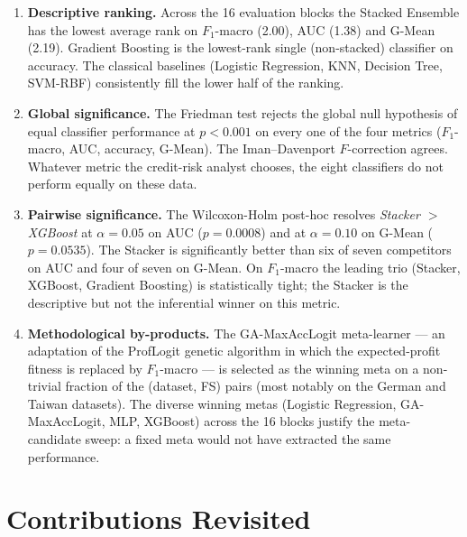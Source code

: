 \begin{enumerate}
 \item \textbf{Descriptive ranking.} Across the 16 evaluation
 blocks the Stacked Ensemble has the lowest average rank on
 $F_1$-macro (2.00), AUC (1.38) and G-Mean (2.19). Gradient
 Boosting is the lowest-rank single (non-stacked) classifier
 on accuracy. The classical baselines (Logistic Regression,
 KNN, Decision Tree, SVM-RBF) consistently fill the lower half
 of the ranking.
 \item \textbf{Global significance.} The Friedman test rejects
 the global null hypothesis of equal classifier performance at
 $p<0.001$ on every one of the four metrics ($F_1$-macro, AUC,
 accuracy, G-Mean). The Iman--Davenport $F$-correction agrees.
 Whatever metric the credit-risk analyst chooses, the eight
 classifiers do not perform equally on these data.
 \item \textbf{Pairwise significance.} The Wilcoxon-Holm
 post-hoc resolves \emph{Stacker $>$ XGBoost} at $\alpha=0.05$
 on AUC ($p=0.0008$) and at $\alpha=0.10$ on G-Mean
 ($p=0.0535$). The Stacker is significantly better than six
 of seven competitors on AUC and four of seven on G-Mean.
 On $F_1$-macro the leading trio (Stacker, XGBoost, Gradient
 Boosting) is statistically tight; the Stacker is the
 descriptive but not the inferential winner on this metric.
 \item \textbf{Methodological by-products.} The GA-MaxAccLogit
 meta-learner --- an adaptation of the ProfLogit
 \citep{stripling2018proflogit} genetic algorithm in which the
 expected-profit fitness is replaced by $F_1$-macro --- is
 selected as the winning meta on a non-trivial fraction of the
 (dataset, FS) pairs (most notably on the German and Taiwan
 datasets). The diverse winning metas (Logistic Regression,
 GA-MaxAccLogit, MLP, XGBoost) across the 16 blocks justify
 the meta-candidate sweep: a fixed meta would not have
 extracted the same performance.
\end{enumerate}

\section{Contributions Revisited}
\label{sec:contributions-revisited}

